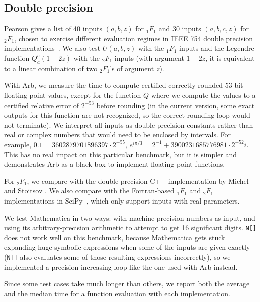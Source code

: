 \documentclass[review,nohypdvips]{siamart0216}
\begin{document}
\subsection{Double precision}

Pearson gives a list of 40 inputs $(a,b,z)$ for ${}_1F_1$
and 30 inputs $(a,b,c,z)$ for ${}_2F_1$, chosen to exercise different
evaluation regimes in IEEE 754 double precision
implementations~\cite{pearson2009computation,pearson2014numerical}.
We also test $U(a,b,z)$ with the ${}_1F_1$ inputs
and the Legendre function $Q_a^c(1-2z)$
with the ${}_2F_1$ inputs (with argument $1-2z$, it is equivalent to a linear
combination of two ${}_2F_1$'s of argument $z$).

With Arb, we measure the time to compute certified correctly rounded 53-bit
floating-point values, except for the function $Q$ where we compute
the values to a certified relative error of $2^{-53}$ before
rounding (in the current version,
some exact outputs for this function are not recognized,
so the correct-rounding loop would not terminate).
We interpret all inputs as double precision constants rather than
real or complex numbers that would need to be enclosed by intervals.
For example, $0.1 = 3602879701896397 \cdot 2^{-55}$, $e^{i \pi/3} = 2^{-1} + 3900231685776981 \cdot 2^{-52} i$.
This has no real impact on this particular benchmark, but it is
simpler and demonstrates Arb as a black box to implement floating-point functions.

For ${}_2F_1$, we compare with the double precision C++ implementation
by Michel and Stoitsov \cite{michel2008fast}.
We also compare with the Fortran-based ${}_1F_1$ and ${}_2F_1$ implementations in
SciPy~\cite{scipy}, which only support inputs with real parameters.

We test Mathematica in two ways: with machine precision numbers as input,
and using its arbitrary-precision arithmetic to attempt to get 16 significant digits.
\texttt{N[]} does not work well
on this benchmark, because Mathematica gets stuck expanding huge symbolic
expressions when some of the inputs are given exactly (\texttt{N[]}
also evaluates some of those resulting expressions incorrectly),
so we implemented a precision-increasing loop like the one used
with Arb instead.

Since some test cases take much longer than others,
we report both the average and the median time for a function
evaluation with each implementation.
\end{document}
